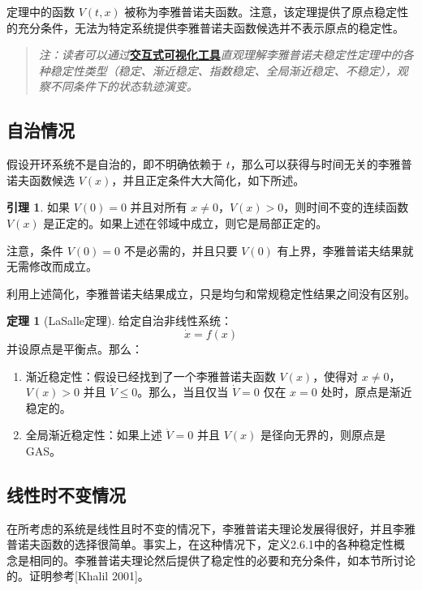 \documentclass[UTF8,12pt,a4paper]{ctexart}
\theoremstyle{definition}
\newtheorem{theorem}{定理}[section]
\newtheorem{lemma}{引理}[section]
\begin{document}
定理中的函数 $V(t, x)$ 被称为李雅普诺夫函数。注意，该定理提供了原点稳定性的充分条件，无法为特定系统提供李雅普诺夫函数候选并不表示原点的稳定性。

\begin{quote}
\textit{注：读者可以通过}\href{https://frankjie09.github.io/Robot-Manipulator-Control-CN/figures/Lyapunov_Stability_Demo.html}{\textbf{交互式可视化工具}}\textit{直观理解李雅普诺夫稳定性定理中的各种稳定性类型（稳定、渐近稳定、指数稳定、全局渐近稳定、不稳定），观察不同条件下的状态轨迹演变。}
\end{quote}

\subsection{自治情况}

假设开环系统不是自治的，即不明确依赖于 $t$，那么可以获得与时间无关的李雅普诺夫函数候选 $V(x)$，并且正定条件大大简化，如下所述。

\begin{lemma}
如果 $V(0)=0$ 并且对所有 $x \neq 0$，$V(x) > 0$，则时间不变的连续函数 $V(x)$ 是正定的。如果上述在邻域中成立，则它是局部正定的。
\end{lemma}

注意，条件 $V(0)=0$ 不是必需的，并且只要 $V(0)$ 有上界，李雅普诺夫结果就无需修改而成立。

利用上述简化，李雅普诺夫结果成立，只是均匀和常规稳定性结果之间没有区别。

\begin{theorem}[LaSalle定理]
给定自治非线性系统：
\[
\dot{x} = f(x)
\]
并设原点是平衡点。那么：
\begin{enumerate}
\item 渐近稳定性：假设已经找到了一个李雅普诺夫函数 $V(x)$，使得对 $x \neq 0$，$V(x) > 0$ 并且 $\dot{V} \leq 0$。那么，当且仅当 $\dot{V}=0$ 仅在 $x=0$ 处时，原点是渐近稳定的。
\item 全局渐近稳定性：如果上述 $\dot{V}=0$ 并且 $V(x)$ 是径向无界的，则原点是GAS。
\end{enumerate}
\end{theorem}

\subsection{线性时不变情况}

在所考虑的系统是线性且时不变的情况下，李雅普诺夫理论发展得很好，并且李雅普诺夫函数的选择很简单。事实上，在这种情况下，定义2.6.1中的各种稳定性概念是相同的。李雅普诺夫理论然后提供了稳定性的必要和充分条件，如本节所讨论的。证明参考[Khalil 2001]。
\end{document}
